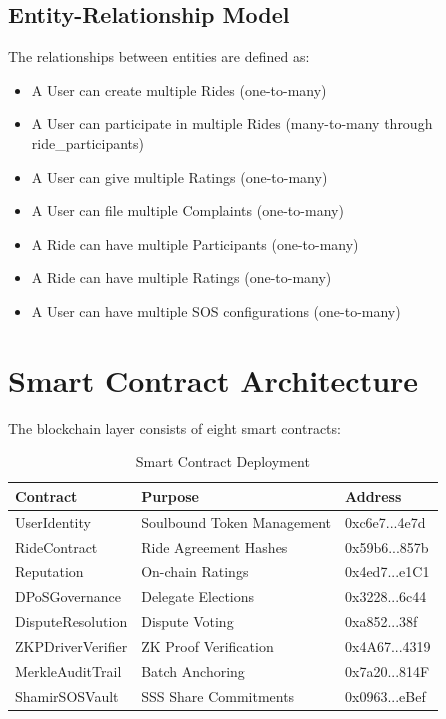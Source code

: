 \documentclass[12pt]{report}
\theoremstyle{plain}
\theoremstyle{definition}
\theoremstyle{remark}
\begin{document}
\subsection{Entity-Relationship Model}

The relationships between entities are defined as:

\begin{itemize}
    \item A User can create multiple Rides (one-to-many)
    \item A User can participate in multiple Rides (many-to-many through ride\_participants)
    \item A User can give multiple Ratings (one-to-many)
    \item A User can file multiple Complaints (one-to-many)
    \item A Ride can have multiple Participants (one-to-many)
    \item A Ride can have multiple Ratings (one-to-many)
    \item A User can have multiple SOS configurations (one-to-many)
\end{itemize}

\section{Smart Contract Architecture}

The blockchain layer consists of eight smart contracts:

\begin{table}[H]
\centering
\caption{Smart Contract Deployment}
\begin{tabular}{|l|l|l|}
\hline
\textbf{Contract} & \textbf{Purpose} & \textbf{Address} \\
\hline
UserIdentity & Soulbound Token Management & 0xc6e7...4e7d \\
RideContract & Ride Agreement Hashes & 0x59b6...857b \\
Reputation & On-chain Ratings & 0x4ed7...e1C1 \\
DPoSGovernance & Delegate Elections & 0x3228...6c44 \\
DisputeResolution & Dispute Voting & 0xa852...38f \\
ZKPDriverVerifier & ZK Proof Verification & 0x4A67...4319 \\
MerkleAuditTrail & Batch Anchoring & 0x7a20...814F \\
ShamirSOSVault & SSS Share Commitments & 0x0963...eBef \\
\hline
\end{tabular}
\end{table}
\end{document}
